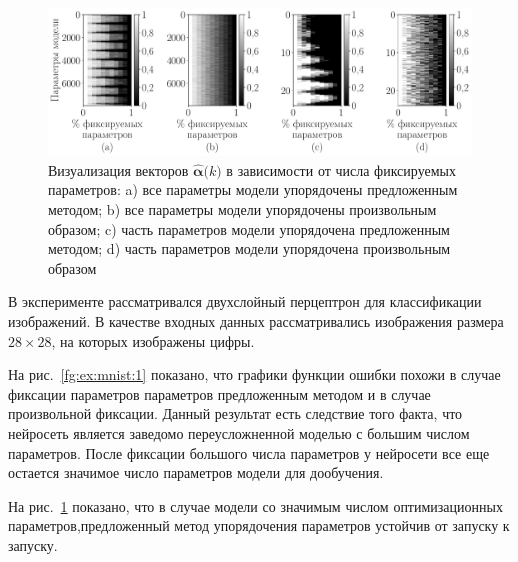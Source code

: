 \begin{figure}[h!t]\center
\includegraphics[width=1\textwidth]{results/order/mnist_data_matshow}
\caption{Визуализация векторов $\hat{\bm{\alpha}}\bigr(k\bigr)$ в зависимости от числа фиксируемых параметров: a) все параметры модели упорядочены предложенным методом; b) все параметры модели упорядочены произвольным образом; c) часть параметров модели упорядочена предложенным методом; d) часть параметров модели упорядочена произвольным образом}
\label{fg:ex:mnist:2}
\end{figure}

В эксперименте рассматривался двухслойный перцептрон для классификации изображений. В качестве входных данных рассматривались изображения размера $28\times28$, на которых изображены цифры. 

На рис.~\ref{fg:ex:mnist:1} показано, что графики функции ошибки похожи в случае фиксации параметров параметров предложенным методом и в случае произвольной фиксации. Данный результат есть следствие того факта, что нейросеть является заведомо переусложненной моделью с большим числом параметров. После фиксации большого числа параметров у нейросети все еще остается значимое число параметров модели для дообучения.

На рис.~\ref{fg:ex:mnist:2} показано, что в случае модели со значимым числом оптимизационных параметров,предложенный метод упорядочения параметров устойчив от запуску к запуску.

